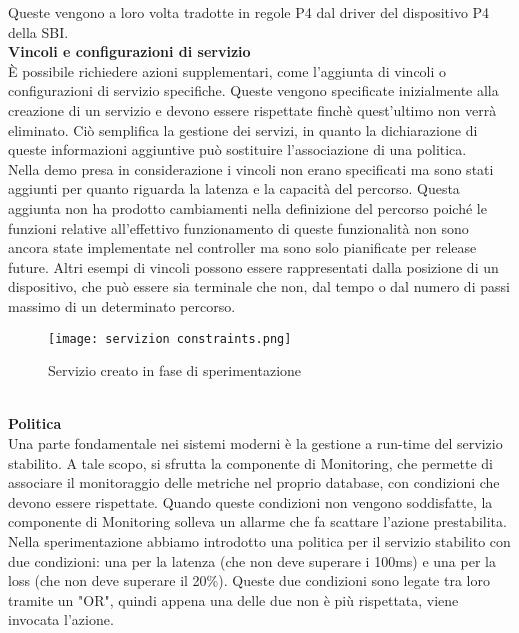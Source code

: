 Queste vengono a loro volta tradotte in regole P4 dal driver del dispositivo P4 della SBI.
\\\textbf{Vincoli e configurazioni di servizio}
\\È possibile richiedere azioni supplementari, come l'aggiunta di vincoli o configurazioni di servizio specifiche. 
Queste vengono specificate inizialmente alla creazione di un servizio e devono essere rispettate finchè quest'ultimo non verrà eliminato. 
Ciò semplifica la gestione dei servizi, in quanto la dichiarazione di queste informazioni aggiuntive può sostituire l'associazione di una politica.
\\Nella demo presa in considerazione i vincoli non erano specificati ma sono stati aggiunti per quanto riguarda la latenza e la capacità del percorso.
Questa aggiunta non ha prodotto cambiamenti nella definizione del percorso poiché le funzioni relative all'effettivo funzionamento di queste funzionalità non 
sono ancora state implementate nel controller ma sono solo pianificate per release future.
Altri esempi di vincoli possono essere rappresentati dalla posizione di un dispositivo, che può essere sia terminale che non, dal tempo o dal numero di passi massimo di un determinato percorso.
\begin{figure}[h]
    \centering
   \texttt{[image: servizion constraints.png]}
    \caption{Servizio creato in fase di sperimentazione}
    \label{fig:constraints}
\end{figure}
\\\textbf{Politica}
\\Una parte fondamentale nei sistemi moderni è la gestione a run-time del servizio stabilito\cite{demo}.
A tale scopo, si sfrutta la componente di Monitoring, che permette di associare il monitoraggio delle metriche nel proprio database,
con condizioni che devono essere rispettate.
Quando queste condizioni non vengono soddisfatte, la componente di Monitoring solleva un allarme che fa scattare l'azione prestabilita.
\\Nella sperimentazione abbiamo introdotto una politica per il servizio stabilito con due condizioni: una per la latenza (che non deve superare i 100ms) e una per la loss (che non deve superare il 20\%).
Queste due condizioni sono legate tra loro tramite un "OR", quindi appena una delle due non è più rispettata, viene invocata l'azione.
